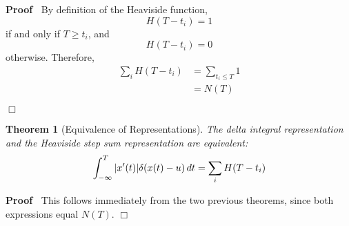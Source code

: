 \documentclass{article}
\newenvironment{proof}{\noindent\textbf{Proof\ }}{\hspace*{\fill}$\Box$\medskip}
\newtheorem{theorem}{Theorem}
\begin{document}
\begin{proof}
  By definition of the Heaviside function,
  \begin{equation}
    H (T - t_i) = 1
  \end{equation}
  if and only if $T \geq t_i$, and
  \begin{equation}
    H (T - t_i) = 0
  \end{equation}
  otherwise. Therefore,
  \begin{equation}
    \begin{array}{ll}
      \sum_i H (T - t_i) & = \sum_{t_i \leq T} 1\\
      & = N (T)
    \end{array}
  \end{equation}
  
\end{proof}

\begin{theorem}
  [Equivalence of Representations] The delta integral representation and the
  Heaviside step sum representation are equivalent:
  \begin{equation}
    \int_{- \infty}^T |x' (t) | \delta (x (t) - u)  \hspace{0.17em} dt =
    \sum_i H (T - t_i)
  \end{equation}
\end{theorem}

\begin{proof}
  This follows immediately from the two previous theorems, since both
  expressions equal $N (T)$.
\end{proof}
\end{document}
